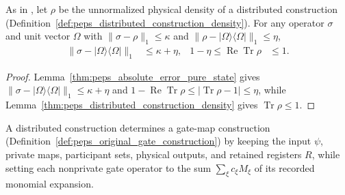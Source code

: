 \begin{lemma}
    \label{thm:peps_compression_retained_norm}
    \leanok
    As in \cite[Remark~5.3]{OpenAI2026PolynomialPEPS}, let $\rho$ be the
    unnormalized physical density of a distributed construction
    (Definition~\ref{def:peps_distributed_construction_density}). For any
    operator $\sigma$ and unit vector $\Omega$ with $\|\sigma-\rho\|_1\le\kappa$
    and $\|\rho-|\Omega\rangle\langle\Omega|\|_1\le\eta$,
    \begin{align}
        \|\sigma-|\Omega\rangle\langle\Omega|\|_1       & \le\kappa+\eta, &
        1-\eta\le\operatorname{Re}\operatorname{Tr}\rho & \le1.
        \label{eq:peps_compression_retained_norm}
    \end{align}
\end{lemma}
\begin{proof}
    \leanok
    Lemma~\ref{thm:peps_absolute_error_pure_state} gives
    $\|\sigma-|\Omega\rangle\langle\Omega|\|_1\le\kappa+\eta$ and
    $1-\operatorname{Re}\operatorname{Tr}\rho\le\lvert\operatorname{Tr}\rho-1\rvert\le\eta$,
    while Lemma~\ref{thm:peps_distributed_construction_density} gives
    $\operatorname{Tr}\rho\le 1$.
\end{proof}

\begin{definition}
    \label{def:peps_distributed_construction_gate_maps}
    \leanok
    A distributed construction determines a gate-map construction
    (Definition~\ref{def:peps_original_gate_construction}) by keeping the input
    $\psi$, private maps, participant sets, physical outputs, and retained
    registers $R$, while setting each nonprivate gate operator to the sum
    $\sum_\xi c_\xi M_\xi$ of its recorded monomial expansion.
\end{definition}

